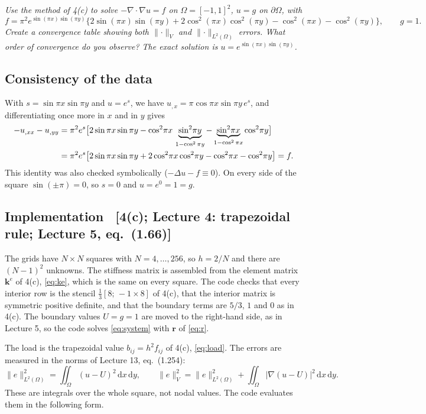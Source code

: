 \documentclass[11pt]{article}
\newcommand{\dxdy}{\,\mathrm{d}x\,\mathrm{d}y}
\newcommand{\norm}[1]{\lVert #1\rVert}
\newcommand{\abs}[1]{\lvert #1\rvert}
\newcommand{\Om}{\Omega}
\newcommand{\dOm}{\partial\Omega}
\newcommand{\grad}{\nabla}
\newcommand{\lap}{\Delta}
\newcommand{\src}[1]{{\small\color{black!55}\textsf{[#1]}}}
\begin{document}
{\itshape Use the method of 4(c) to solve $-\grad\cdot\grad u=f$ on
$\Om=[-1,1]^{2}$, $u=g$ on $\dOm$, with
\[
  f=\pi^{2}e^{\sin(\pi x)\sin(\pi y)}\bigl\{2\sin(\pi x)\sin(\pi y)
   +2\cos^{2}(\pi x)\cos^{2}(\pi y)-\cos^{2}(\pi x)-\cos^{2}(\pi y)\bigr\},
  \qquad g=1 .
\]
Create a convergence table showing both $\norm{\cdot}_{V}$ and
$\norm{\cdot}_{L^{2}(\Om)}$ errors.  What order of convergence do you observe?
The exact solution is $u=e^{\sin(\pi x)\sin(\pi y)}$.\par}

\subsection*{Consistency of the data}

With $s=\sin\pi x\sin\pi y$ and $u=e^{s}$, we have
$u_{,x}=\pi\cos\pi x\sin\pi y\,e^{s}$, and differentiating once more in $x$
and in $y$ gives
\begin{align}
  -u_{,xx}-u_{,yy}
  &=\pi^{2}e^{s}\bigl[2\sin\pi x\sin\pi y
     -\cos^{2}\!\pi x\,\underbrace{\sin^{2}\!\pi y}_{1-\cos^{2}\pi y}
     -\underbrace{\sin^{2}\!\pi x}_{1-\cos^{2}\pi x}\cos^{2}\!\pi y\bigr]\notag\\
  &=\pi^{2}e^{s}\bigl[2\sin\pi x\sin\pi y+2\cos^{2}\!\pi x\cos^{2}\!\pi y
     -\cos^{2}\!\pi x-\cos^{2}\!\pi y\bigr]=f .\label{eq:lap}
\end{align}
This identity was also checked symbolically ($-\lap u-f\equiv0$).  On every
side of the square $\sin(\pm\pi)=0$, so $s=0$ and $u=e^{0}=1=g$.

\subsection*{Implementation \ \src{4(c); Lecture 4: trapezoidal rule; Lecture 5, eq.~(1.66)}}

The grids have $N\times N$ squares with $N=4,\dots,256$, so $h=2/N$ and there
are $(N-1)^{2}$ unknowns.  The stiffness matrix is assembled from the element
matrix $\bm k^{e}$ of 4(c), \eqref{eq:ke}, which is the same on every square.  The code
checks that every interior row is the stencil $\tfrac13[8;\,-1\times8]$ of
4(c), that the interior matrix is symmetric positive definite, and that the
boundary terms are $5/3$, $1$ and $0$ as in 4(c).  The boundary values
$U=g=1$ are moved to the right-hand side, as in Lecture 5, so the code solves
\eqref{eq:system} with $\bm r$ of \eqref{eq:r}.

The load is the trapezoidal value $b_{ij}=h^{2}f_{ij}$ of 4(c),
\eqref{eq:load}.  The errors are measured in the norms of Lecture 13,
eq.~(1.254):
\begin{equation}\label{eq:norms}
  \norm{e}_{L^{2}(\Om)}^{2}=\iint_{\Om}(u-U)^{2}\dxdy,
  \qquad
  \norm{e}_{V}^{2}=\norm{e}_{L^{2}(\Om)}^{2}+\iint_{\Om}\abs{\grad(u-U)}^{2}\dxdy .
\end{equation}
These are integrals over the whole square, not nodal values.  The code
evaluates them in the following form.
\end{document}
